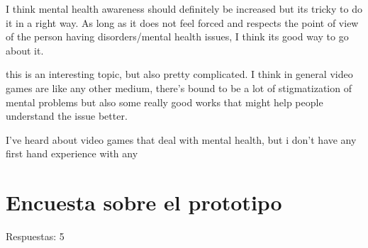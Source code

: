 \documentclass[12pt, a4paper,twoside,titlepage]{book}
\begin{document}
\begin{enumerate}[label=\textbf{\arabic*}.]
        I think mental health awareness should definitely be increased but its tricky to do it in a right way. As long as it does not feel forced and respects the point of view of the person having disorders/mental health issues, I think its good way to go about it.
        
        this is an interesting topic, but also pretty complicated. I think in general video games are like any other medium, there's bound to be a lot of stigmatization of mental problems but also some really good works that might help people understand the issue better.
        
        I've heard about video games that deal with mental health, but i don't have any first hand experience with any


\end{enumerate}








\chapter{Encuesta sobre el prototipo}
\label{sec:anexo2}

Respuestas: 5
\end{document}
